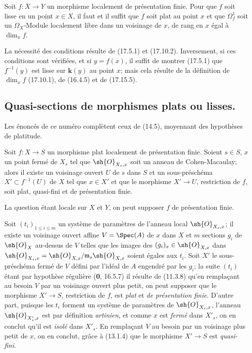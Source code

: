 \begin{proposition}[17.15.15]
\label{IV.17.15.15}
Soit $f:X\to Y$ un morphisme localement de présentation finie. Pour que $f$ soit lisse en un point $x\in X$, il faut et il suffit que $f$ soit plat au point $x$ et que $\varOmega^1_f$ soit un $\Omega_X$-Module localement libre dans un voisinage de $x$, de rang en $x$ égal à $\dim_x f$.
\end{proposition}

La nécessité des conditions résulte de (17.5.1) et (17.10.2). Inversement, si ces conditions sont vérifiées, et si $y=f(x)$, il suffit de montrer (17.5.1) que $f^{-1}(y)$ est lisse sur $\boldsymbol{k}(y)$ au point $x$; mais cela résulte de la définition de $\dim_x f$ (17.10.1), de (16.4.5) et de (17.15.5).

\subsection{Quasi-sections de morphismes plats ou lisses.}

Les énoncés de ce numéro complètent ceux de (14.5), moyennant des hypothèses de platitude.

\begin{proposition}[17.16.1]
\label{IV.17.16.1}
Soit $f:X\to S$ un morphisme plat localement de présentation finie. Soient $s\in S$, $x$ un point fermé de $X_s$ tel que $\sh{O}_{X_s,x}$ soit un anneau de Cohen-Macaulay; alors il existe un voisinage ouvert $U$ de $s$ dans $S$ et un sous-préschéma $X'\subset f^{-1}(U)$ de $X$ tel que $x\in X'$ et que le morphisme $X'\to U$, restriction de $f$, soit plat, quasi-fini et de présentation finie.
\end{proposition}

La question étant locale sur $X$ et $Y$, on peut supposer $f$ de présentation finie.

Soit $(t_i)_{1\leq i\leq m}$ un système de paramètres de l'anneau local $\sh{O}_{X_s,x}$; il existe un voisinage ouvert affine $V=\Spec(A)$ de $x$ dans $X$ et $m$ sections $g_i$ de $\sh{O}_X$ au-dessus de $V$ telles que
les images des $(g_i)_x\in\sh{O}_{X,x}$ dans $\sh{O}_{X_s,x}=\sh{O}_{X,x}/\mathfrak m_s\sh{O}_{X,x}$ soient égales aux $t_i$. Soit $X'$ le sous-préschéma fermé de $V$ défini par l'idéal de $A$ engendré par les $g_i$; la suite $(t_i)$ étant par hypothèse régulière (\textbf{0}, 16.5.7) il résulte de (11.3.8) qu'en remplaçant au besoin $V$ par un voisinage ouvert plus petit, on peut supposer que le morphisme $X'\to S$, restriction de $f$, est \emph{plat} et \emph{de présentation finie}. D'autre part, puisque les $t_i$ forment un système de paramètres de $\sh{O}_{X_s,x}$, l'anneau $\sh{O}_{X'_s,x}$ est par définition \emph{artinien}, et comme $x$ est \emph{fermé} dans $X'_s$, on en conclut qu'il est \emph{isolé} dans $X'_s$. En remplaçant $V$ au besoin par un voisinage plus petit de $x$, on en conclut, grâce à (13.1.4) que le morphisme $X'\to S$ est \emph{quasi-fini}.

